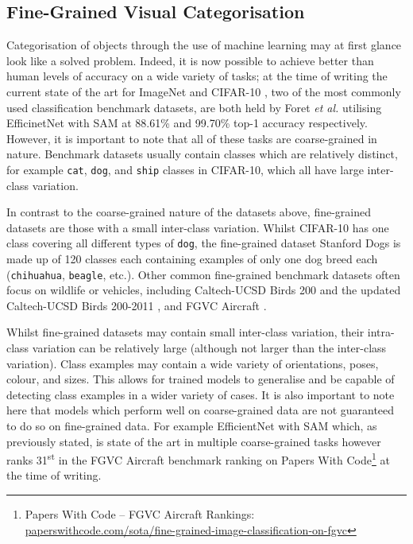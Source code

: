 \subsection{Fine-Grained Visual Categorisation}\label{ch:Background,sec:Fine-grainedCV}

Categorisation of objects through the use of machine learning may at first glance look like a solved problem. Indeed, it is now possible to achieve better than human levels of accuracy on a wide variety of tasks; at the time of writing the current state of the art for ImageNet \cite{deng_imagenet:_2009} and CIFAR-10 \cite{krizhevsky_learning_2009}, two of the most commonly used classification benchmark datasets, are both held by Foret \textit{et al.} utilising EfficinetNet with SAM \cite{foret_sharpness-aware_2020} at 88.61\% and 99.70\% top-1 accuracy respectively. However, it is important to note that all of these tasks are coarse-grained in nature. Benchmark datasets usually contain classes which are relatively distinct, for example \texttt{cat}, \texttt{dog}, and \texttt{ship} classes in CIFAR-10, which all have large inter-class variation. 

In contrast to the coarse-grained nature of the datasets above, fine-grained datasets are those with a small inter-class variation. Whilst CIFAR-10 has one class covering all different types of \texttt{dog}, the fine-grained dataset Stanford Dogs \cite{khosla_novel_2011} is made up of 120 classes each containing examples of only one dog breed each (\texttt{chihuahua}, \texttt{beagle}, etc.). Other common fine-grained benchmark datasets often focus on wildlife or vehicles, including Caltech-UCSD Birds 200 \cite{welinder_caltech-ucsd_2010} and the updated Caltech-UCSD Birds 200-2011 \cite{wah_caltech-ucsd_2011}, and FGVC Aircraft \cite{maji_fine-grained_2013}. 

Whilst fine-grained datasets may contain small inter-class variation, their intra-class variation can be relatively large (although not larger than the inter-class variation). Class examples may contain a wide variety of orientations, poses, colour, and sizes. This allows for trained models to generalise and be capable of detecting class examples in a wider variety of cases. It is also important to note here that models which perform well on coarse-grained data are not guaranteed to do so on fine-grained data. For example EfficientNet with SAM which, as previously stated, is state of the art in multiple coarse-grained tasks however ranks 31\textsuperscript{st} in the FGVC Aircraft benchmark ranking on Papers With Code\footnote{Papers With Code -- FGVC Aircraft Rankings: \href{https://paperswithcode.com/sota/fine-grained-image-classification-on-fgvc}{paperswithcode.com/sota/fine-grained-image-classification-on-fgvc}} at the time of writing.

